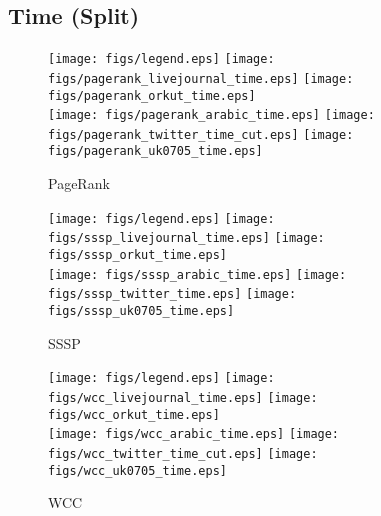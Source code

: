 \documentclass{article}
\newcommand{\bline}[1][1]{\vspace{#1\baselineskip}}
\begin{document}
\subsection{Time (Split)}
\begin{figure}[!h]
  \centering
  \texttt{[image: figs/legend.eps]}\hspace{3em}%
  \texttt{[image: figs/pagerank\_livejournal\_time.eps]}\hspace{1em}%
  \texttt{[image: figs/pagerank\_orkut\_time.eps]}\\
  \texttt{[image: figs/pagerank\_arabic\_time.eps]}\hspace{1em}%
  \texttt{[image: figs/pagerank\_twitter\_time\_cut.eps]}\hspace{1em}%
  \texttt{[image: figs/pagerank\_uk0705\_time.eps]}
  \caption{PageRank}
\end{figure}

\begin{figure}[!h]
  \bline[3.5]
  \centering
  \texttt{[image: figs/legend.eps]}\hspace{3em}%
  \texttt{[image: figs/sssp\_livejournal\_time.eps]}\hspace{1em}%
  \texttt{[image: figs/sssp\_orkut\_time.eps]}\\
  \texttt{[image: figs/sssp\_arabic\_time.eps]}\hspace{1em}%
  \texttt{[image: figs/sssp\_twitter\_time.eps]}\hspace{1em}%
  \texttt{[image: figs/sssp\_uk0705\_time.eps]}
  \caption{SSSP}
\end{figure}

\begin{figure}[!h]
  \bline[3.5]
  \centering
  \texttt{[image: figs/legend.eps]}\hspace{3em}%
  \texttt{[image: figs/wcc\_livejournal\_time.eps]}\hspace{1em}%
  \texttt{[image: figs/wcc\_orkut\_time.eps]}\\
  \texttt{[image: figs/wcc\_arabic\_time.eps]}\hspace{1em}%
  \texttt{[image: figs/wcc\_twitter\_time\_cut.eps]}\hspace{1em}%
  \texttt{[image: figs/wcc\_uk0705\_time.eps]}
  \caption{WCC}
\end{figure}
\end{document}
